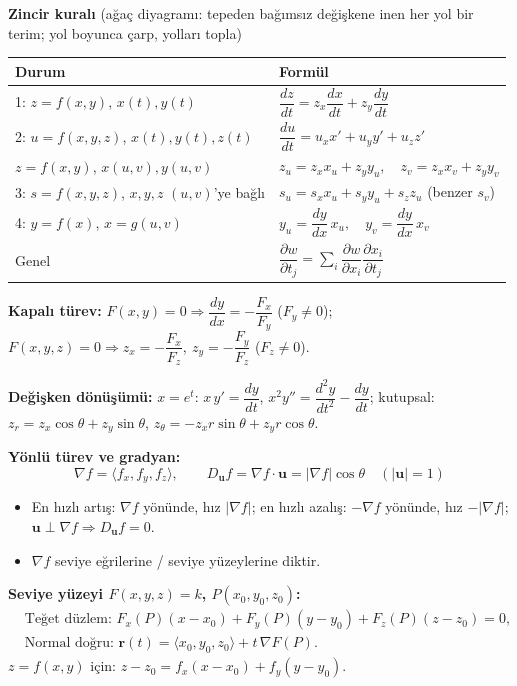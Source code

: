 \begin{ozet}
\textbf{Zincir kuralı} (ağaç diyagramı: tepeden bağımsız değişkene inen her yol bir terim; yol boyunca çarp, yolları topla)
\begin{center}
\begin{tabular}{l l}
\toprule
Durum & Formül\\
\midrule
1: $z=f(x,y)$, $x(t),y(t)$ & $\dfrac{dz}{dt}=z_x\dfrac{dx}{dt}+z_y\dfrac{dy}{dt}$\\[8pt]
2: $u=f(x,y,z)$, $x(t),y(t),z(t)$ & $\dfrac{du}{dt}=u_x x'+u_y y'+u_z z'$\\[6pt]
$z=f(x,y)$, $x(u,v),y(u,v)$ & $z_u=z_xx_u+z_yy_u,\quad z_v=z_xx_v+z_yy_v$\\[4pt]
3: $s=f(x,y,z)$, $x,y,z$ $(u,v)$'ye bağlı & $s_u=s_xx_u+s_yy_u+s_zz_u$ (benzer $s_v$)\\[4pt]
4: $y=f(x)$, $x=g(u,v)$ & $y_u=\dfrac{dy}{dx}\,x_u,\quad y_v=\dfrac{dy}{dx}\,x_v$\\[6pt]
Genel & $\dfrac{\partial w}{\partial t_j}=\sum_i \dfrac{\partial w}{\partial x_i}\dfrac{\partial x_i}{\partial t_j}$\\
\bottomrule
\end{tabular}
\end{center}
\textbf{Kapalı türev:} $F(x,y)=0\Rightarrow \dfrac{dy}{dx}=-\dfrac{F_x}{F_y}$ ($F_y\ne0$);\quad
$F(x,y,z)=0\Rightarrow z_x=-\dfrac{F_x}{F_z},\ z_y=-\dfrac{F_y}{F_z}$ ($F_z\ne0$).

\textbf{Değişken dönüşümü:} $x=e^t$: $x\,y'=\dfrac{dy}{dt}$, $x^2y''=\dfrac{d^2y}{dt^2}-\dfrac{dy}{dt}$;
kutupsal: $z_r=z_x\cos\theta+z_y\sin\theta$, $z_\theta=-z_x r\sin\theta+z_y r\cos\theta$.

\textbf{Yönlü türev ve gradyan:}
\[
\nabla f=\langle f_x,f_y,f_z\rangle,\qquad D_{\mathbf u}f=\nabla f\cdot\mathbf u=|\nabla f|\cos\theta\quad(|\mathbf u|=1)
\]
\begin{itemize}
  \item En hızlı artış: $\nabla f$ yönünde, hız $|\nabla f|$; en hızlı azalış: $-\nabla f$ yönünde, hız $-|\nabla f|$;
        $\mathbf u\perp\nabla f\Rightarrow D_{\mathbf u}f=0$.
  \item $\nabla f$ seviye eğrilerine / seviye yüzeylerine diktir.
\end{itemize}
\textbf{Seviye yüzeyi $F(x,y,z)=k$, $P(x_0,y_0,z_0)$:}
\begin{align*}
&\text{Teğet düzlem: } F_x(P)(x-x_0)+F_y(P)(y-y_0)+F_z(P)(z-z_0)=0,\\
&\text{Normal doğru: } \mathbf r(t)=\langle x_0,y_0,z_0\rangle+t\,\nabla F(P).
\end{align*}
$z=f(x,y)$ için: $z-z_0=f_x(x-x_0)+f_y(y-y_0)$.
\end{ozet}
